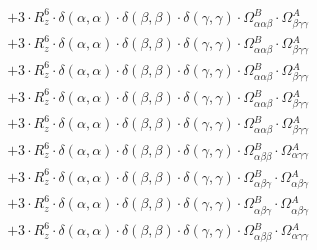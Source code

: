 \documentclass{article}
\begin{document}
\begin{subequations}
\begin{gather}
\begin{array}{c}
 \\[0.2em] 		 + 3 \cdot R_{z}^{6} \cdot \delta{}\left(\alpha{}, \alpha{}\right) \cdot \delta{}\left(\beta{}, \beta{}\right) \cdot \delta{}\left(\gamma{}, \gamma{}\right) \cdot \Omega{}^{B}_{\alpha{}\alpha{}\beta{}} \cdot \Omega{}^{A}_{\beta{}\gamma{}\gamma{}} 
 \\[0.2em] 		 + 3 \cdot R_{z}^{6} \cdot \delta{}\left(\alpha{}, \alpha{}\right) \cdot \delta{}\left(\beta{}, \beta{}\right) \cdot \delta{}\left(\gamma{}, \gamma{}\right) \cdot \Omega{}^{B}_{\alpha{}\alpha{}\beta{}} \cdot \Omega{}^{A}_{\beta{}\gamma{}\gamma{}} 
 \\[0.2em] 		 + 3 \cdot R_{z}^{6} \cdot \delta{}\left(\alpha{}, \alpha{}\right) \cdot \delta{}\left(\beta{}, \beta{}\right) \cdot \delta{}\left(\gamma{}, \gamma{}\right) \cdot \Omega{}^{B}_{\alpha{}\alpha{}\beta{}} \cdot \Omega{}^{A}_{\beta{}\gamma{}\gamma{}} 
 \\[0.2em] 		 + 3 \cdot R_{z}^{6} \cdot \delta{}\left(\alpha{}, \alpha{}\right) \cdot \delta{}\left(\beta{}, \beta{}\right) \cdot \delta{}\left(\gamma{}, \gamma{}\right) \cdot \Omega{}^{B}_{\alpha{}\alpha{}\beta{}} \cdot \Omega{}^{A}_{\beta{}\gamma{}\gamma{}} 
 \\[0.2em] 		 + 3 \cdot R_{z}^{6} \cdot \delta{}\left(\alpha{}, \alpha{}\right) \cdot \delta{}\left(\beta{}, \beta{}\right) \cdot \delta{}\left(\gamma{}, \gamma{}\right) \cdot \Omega{}^{B}_{\alpha{}\alpha{}\beta{}} \cdot \Omega{}^{A}_{\beta{}\gamma{}\gamma{}} 
 \\[0.2em] 		 + 3 \cdot R_{z}^{6} \cdot \delta{}\left(\alpha{}, \alpha{}\right) \cdot \delta{}\left(\beta{}, \beta{}\right) \cdot \delta{}\left(\gamma{}, \gamma{}\right) \cdot \Omega{}^{B}_{\alpha{}\beta{}\beta{}} \cdot \Omega{}^{A}_{\alpha{}\gamma{}\gamma{}} 
 \\[0.2em] 		 + 3 \cdot R_{z}^{6} \cdot \delta{}\left(\alpha{}, \alpha{}\right) \cdot \delta{}\left(\beta{}, \beta{}\right) \cdot \delta{}\left(\gamma{}, \gamma{}\right) \cdot \Omega{}^{B}_{\alpha{}\beta{}\gamma{}} \cdot \Omega{}^{A}_{\alpha{}\beta{}\gamma{}} 
 \\[0.2em] 		 + 3 \cdot R_{z}^{6} \cdot \delta{}\left(\alpha{}, \alpha{}\right) \cdot \delta{}\left(\beta{}, \beta{}\right) \cdot \delta{}\left(\gamma{}, \gamma{}\right) \cdot \Omega{}^{B}_{\alpha{}\beta{}\gamma{}} \cdot \Omega{}^{A}_{\alpha{}\beta{}\gamma{}} 
 \\[0.2em] 		 + 3 \cdot R_{z}^{6} \cdot \delta{}\left(\alpha{}, \alpha{}\right) \cdot \delta{}\left(\beta{}, \beta{}\right) \cdot \delta{}\left(\gamma{}, \gamma{}\right) \cdot \Omega{}^{B}_{\alpha{}\beta{}\beta{}} \cdot \Omega{}^{A}_{\alpha{}\gamma{}\gamma{}} 

\end{array}
\end{gather}
\end{subequations}
\end{document}
